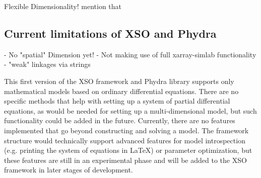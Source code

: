 \documentclass[journal abbreviation, manuscript]{copernicus}
\begin{document}

Flexible Dimensionality! mention that


\subsection{Current limitations of XSO and Phydra}
- No "spatial" Dimension yet!
- Not making use of full xarray-simlab functionality
- "weak" linkages via strings

This first version of the XSO framework and Phydra library supports only mathematical models based on ordinary differential equations. There are no specific methods that help with setting up a system of partial differential equations, as would be needed for setting up a multi-dimensional model, but such functionality could be added in the future. Currently, there are no features implemented that go beyond constructing and solving a model. The framework structure would technically support advanced features for model introspection (e.g. printing the system of equations in LaTeX) or parameter optimization, but these features are still in an experimental phase and will be added to the XSO framework in later stages of development.
\end{document}

